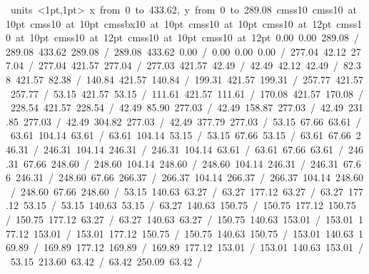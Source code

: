 \hbox{\beginpicture
\setcoordinatesystem units <1pt,1pt>
\setplotarea x from 0 to 433.62, y from 0 to 289.08
\setlinear
\font\picfont cmss10\picfont
\font\picfont cmss10 at 10pt\picfont
\font\picfont cmss10 at 10pt\picfont
\font\picfont cmssbx10 at 10pt\picfont
\font\picfont cmss10 at 10pt\picfont
\font\picfont cmss10 at 12pt\picfont
\font\picfont cmss10 at 10pt\picfont
\font\picfont cmss10 at 12pt\picfont
\font\picfont cmss10 at 10pt\picfont
\font\picfont cmss10 at 12pt\picfont
\setsolid
{} 0.00 0.00 289.08 /
 289.08 433.62 289.08 /
 289.08 433.62 0.00 /
 0.00 0.00 0.00 /
\setsolid
{} 277.04 42.12 277.04 /
 277.04 421.57 277.04 /
 277.03 421.57 42.49 /
 42.49 42.12 42.49 /
\setsolid
{} 82.38 421.57 82.38 /
\setsolid
{} 140.84 421.57 140.84 /
\setsolid
{} 199.31 421.57 199.31 /
\setsolid
{} 257.77 421.57 257.77 /
\setsolid
{} 53.15 421.57 53.15 /
\setsolid
{} 111.61 421.57 111.61 /
\setsolid
{} 170.08 421.57 170.08 /
\setsolid
{} 228.54 421.57 228.54 /
\setsolid
{} 42.49 85.90 277.03 /
\setsolid
{} 42.49 158.87 277.03 /
\setsolid
{} 42.49 231.85 277.03 /
\setsolid
{} 42.49 304.82 277.03 /
\setsolid
{} 42.49 377.79 277.03 /
\setsolid
{} 53.15 67.66 63.61 /
 63.61 104.14 63.61 /
 63.61 104.14 53.15 /
 53.15 67.66 53.15 /
\setsolid
{} 63.61 67.66 246.31 /
 246.31 104.14 246.31 /
 246.31 104.14 63.61 /
 63.61 67.66 63.61 /
\setsolid
{} 246.31 67.66 248.60 /
 248.60 104.14 248.60 /
 248.60 104.14 246.31 /
 246.31 67.66 246.31 /
\setsolid
{} 248.60 67.66 266.37 /
 266.37 104.14 266.37 /
 266.37 104.14 248.60 /
 248.60 67.66 248.60 /
\setsolid
{} 53.15 140.63 63.27 /
 63.27 177.12 63.27 /
 63.27 177.12 53.15 /
 53.15 140.63 53.15 /
\setsolid
{} 63.27 140.63 150.75 /
 150.75 177.12 150.75 /
 150.75 177.12 63.27 /
 63.27 140.63 63.27 /
\setsolid
{} 150.75 140.63 153.01 /
 153.01 177.12 153.01 /
 153.01 177.12 150.75 /
 150.75 140.63 150.75 /
\setsolid
{} 153.01 140.63 169.89 /
 169.89 177.12 169.89 /
 169.89 177.12 153.01 /
 153.01 140.63 153.01 /
\setsolid
{} 53.15 213.60 63.42 /
 63.42 250.09 63.42 /
}

